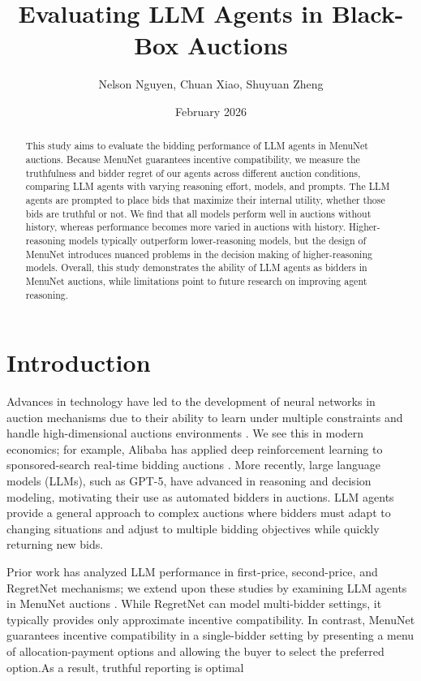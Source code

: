 \documentclass[a4paper]{article}
\title{Evaluating LLM Agents in Black-Box Auctions}
\author{Nelson Nguyen, Chuan Xiao, Shuyuan Zheng}
\date{February 2026}
\begin{document}
\maketitle



\begin{abstract}
This study aims to evaluate the bidding performance of LLM agents in MenuNet auctions. Because MenuNet guarantees incentive compatibility, we measure the truthfulness and bidder regret of our agents across different auction conditions, comparing LLM agents with varying reasoning effort, models, and prompts. The LLM agents are prompted to place bids that maximize their internal utility, whether those bids are truthful or not. We find that all models perform well in auctions without history, whereas performance becomes more varied in auctions with history. Higher-reasoning models typically outperform lower-reasoning models, but the design of MenuNet introduces nuanced problems in the decision making of higher-reasoning models. Overall, this study demonstrates the ability of LLM agents as bidders in MenuNet auctions, while limitations point to future research on improving agent reasoning.
\end{abstract}



\section{Introduction}
Advances in technology have led to the development of neural networks in auction mechanisms due to their ability to learn under multiple constraints and handle high-dimensional auctions environments \cite{dutting2022optimal}. We see this in modern economics; for example, Alibaba has applied deep reinforcement learning to sponsored-search real-time bidding auctions \cite{zhao2018ssrtb}. More recently, large language models (LLMs), such as GPT-5, have advanced in reasoning and decision modeling, motivating their use as automated bidders in auctions. LLM agents provide a general approach to complex auctions where bidders must adapt to changing situations and adjust to multiple bidding objectives while quickly returning new bids.


Prior work has analyzed LLM performance in first-price, second-price, and RegretNet mechanisms; we extend upon these studies by examining LLM agents in MenuNet auctions \cite{anon2024blackbox}. While RegretNet can model multi-bidder settings, it typically provides only approximate incentive compatibility. In contrast, MenuNet guarantees incentive compatibility in a single-bidder setting by presenting a menu of allocation-payment options and allowing the buyer to select the preferred option.As a result, truthful reporting is optimal
\end{document}
